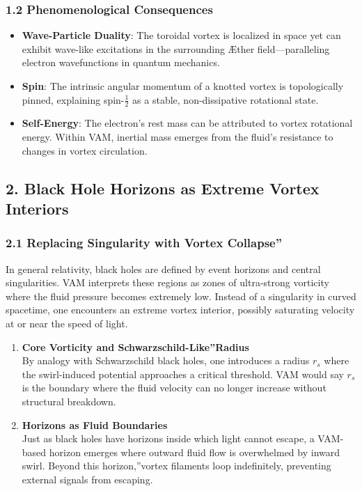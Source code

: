 \subsubsection*{1.2 Phenomenological Consequences}
\begin{itemize}
    \item \textbf{Wave-Particle Duality}: The toroidal vortex is localized in space yet can exhibit wave-like excitations in the surrounding Æther field—paralleling electron wavefunctions in quantum mechanics.
    \item \textbf{Spin}: The intrinsic angular momentum of a knotted vortex is topologically pinned, explaining spin-\(\tfrac{1}{2}\) as a stable, non-dissipative rotational state.
    \item \textbf{Self-Energy}: The electron's rest mass can be attributed to vortex rotational energy. Within VAM, inertial mass emerges from the fluid's resistance to changes in vortex circulation.
\end{itemize}


\subsection*{2. Black Hole Horizons as Extreme Vortex Interiors}

\subsubsection*{2.1 Replacing Singularity with \grqq Vortex Collapse\textquotedblright}
In general relativity, black holes are defined by event horizons and central singularities. VAM interprets these regions as zones of ultra-strong vorticity where the fluid pressure becomes extremely low. Instead of a singularity in curved spacetime, one encounters an extreme vortex interior, possibly saturating velocity at or near the speed of light.

\begin{enumerate}
    \item \textbf{Core Vorticity and \grqq Schwarzschild-Like\textquotedblright Radius} \\
    By analogy with Schwarzschild black holes, one introduces a radius \(r_s\) where the swirl-induced potential approaches a critical threshold. VAM would say \(r_s\) is the boundary where the fluid velocity can no longer increase without structural breakdown.
    \item \textbf{Horizons as Fluid Boundaries} \\
    Just as black holes have horizons inside which light cannot escape, a VAM-based horizon emerges where outward fluid flow is overwhelmed by inward swirl. Beyond this \grqq horizon,\textquotedblright vortex filaments loop indefinitely, preventing external signals from escaping.
\end{enumerate}

